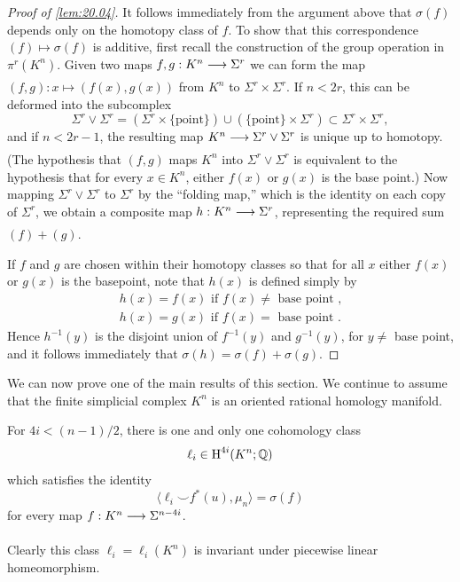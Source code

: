 \documentclass[../main]{subfiles}
\begin{document}
\begin{proof}[Proof of \ref{lem:20.04}]
It follows immediately from the argument above that $\sigma(f)$ depends only on the homotopy class of $f$. To show that this correspondence $(f) \mapsto \sigma(f)$ is additive, first recall the construction of the group operation in $\pi^r(K^n)$. Given two maps $f,g:K^n \varrightarrow{} \Sigma^r$ we can form the map $(f,g):x \mapsto (f(x),g(x))$ from $K^n$ to $\Sigma^r \times \Sigma^r$. If $n<2r$, this can be deformed into the subcomplex \[\Sigma^r \vee \Sigma^r = (\Sigma^r \times \{\text{point}\}) \cup (\{\text{point}\}\times \Sigma^r) \subset \Sigma^r \times \Sigma^r,\] and if $n < 2r-1$, the resulting map $K^n \varrightarrow{} \Sigma^r \vee \Sigma^r$ is unique up to homotopy. (The hypothesis that $(f,g)$ maps $K^n$ into $\Sigma^r \vee \Sigma^r$ is equivalent to the hypothesis that for every $x \in K^n$, either $f(x)$ or $g(x)$ is the base point.) Now mapping $\Sigma^r \vee \Sigma^r$ to $\Sigma^r$ by the ``folding map,'' which is the identity on each copy of $\Sigma^r$, we obtain a composite map $h:K^n \varrightarrow{} \Sigma^r$, representing the required sum $(f) + (g)$.

If $f$ and $g$ are chosen within their homotopy classes so that for all $x$ either $f(x)$ or $g(x)$ is the basepoint, note that $h(x)$ is defined simply by \begin{align*} h(x) = f(x) \text{ if }f(x) \neq \text{ base point ,} \\ h(x) = g(x) \text{ if } f(x) = \text{ base point .} \end{align*} Hence $h^{-1}(y)$ is the disjoint union of $f^{-1}(y)$ and $g^{-1}(y)$, for $y \neq$ base point, and it follows immediately that $\sigma(h) = \sigma(f) +\sigma(g)$.
\end{proof}

We can now prove one of the main results of this section. We continue to assume that the finite simplicial complex $K^n$ is an oriented rational homology manifold.

\begin{theorem}
\label{thm:20.06}
For $4i < (n-1)/2$, there is one and only one cohomology class \[\ell_i \in \operatorname{H}^{4i}(K^n;\mathbb{Q}) \] which satisfies the identity \[ \langle \ell_i \smile f^\ast(u), \mu_n \rangle = \sigma(f) \] for every map $f:K^n \varrightarrow{} \Sigma^{n-4i}$.
\end{theorem}

Clearly this class $\ell_i  = \ell_i(K^n)$ is invariant under piecewise linear homeomorphism.
\end{document}
